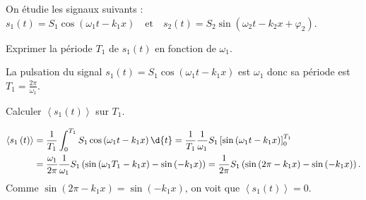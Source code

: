 \finalisationDuPartageDePage %

On étudie les signaux suivants :
$
	s_1\left( t \right) = S_1 \cos \left( \omega_1 t - k_1 x \right) \quad \text{et} \quad
	s_2\left( t \right) = S_2 \sin \left( \omega_2 t - k_2 x + \varphi_2\right)
$.




\begin{enonce}
	Exprimer la période $T_1$ de $s_1(t)$ en fonction de $\omega_1$.
	\end{enonce}
	
	
	\begin{corrige}
		La pulsation du signal $s_1(t) = S_1 \cos \left( \omega_1 t - k_1 x \right)$ est $\omega_1$ donc sa période est $T_1 = \frac{2\pi}{\omega_1}$.
	\end{corrige}
	
	



\begin{enonce}
Calculer $\left< s_1\left( t \right) \right>$ sur $T_1$.
\end{enonce}


\begin{corrige}
	\begin{align*}
	\left< s_1\left( t \right) \right> &= \frac{1}{T_1} \int_0^{T_1} S_1 \cos \left( \omega_1 t - k_1 x \right) \d{t}
	= \frac{1}{T_1}\frac{1}{\omega_1} S_1 \left[ \sin\left( \omega_1 t - k_1 x \right) \right]^{T_1}_{0} \\
	&= \frac{\omega_1}{2\pi}\frac{1}{\omega_1} S_1 \left( \sin\left( \omega_1 T_1 - k_1 x \right) - \sin\left( -k_1 x \right)  \right)
	= \frac{1}{2\pi} S_1 \left( \sin\left( 2\pi -k_1 x \right)  - \sin\left( -k_1 x \right)  \right).
	\end{align*}
	Comme $ \sin\left( 2\pi -k_1 x \right) =  \sin\left( -k_1 x \right)$, on voit que $\left< s_1\left( t \right) \right>=0$.
\end{corrige}

